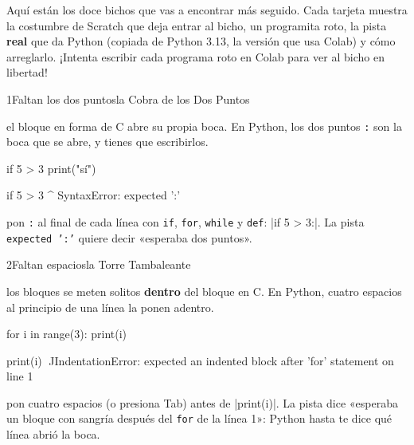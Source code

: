 Aquí están los doce bichos que vas a encontrar más seguido. Cada tarjeta muestra la costumbre de Scratch que deja entrar al bicho, un programita roto, la pista \textbf{real} que da Python (copiada de Python 3.13, la versión que usa Colab) y cómo arreglarlo. ¡Intenta escribir cada programa roto en Colab para ver al bicho en libertad!

\begin{bzcard}{1}{Faltan los dos puntos}{la Cobra de los Dos Puntos}
\noindent\begin{minipage}[c]{0.43\linewidth}
 el bloque en forma de C  abre su propia boca. En Python, los dos puntos \texttt{:} son la boca que se abre, y tienes que escribirlos.
\end{minipage}\hfill
\begin{minipage}[c]{0.54\linewidth}
\begin{bzsnip}
if 5 > 3
    print("sí")
\end{bzsnip}
\end{minipage}\par
\begin{bzerror}
    if 5 > 3
            ^
SyntaxError: expected ':'
\end{bzerror}
 pon \texttt{:} al final de cada línea con \texttt{if}, \texttt{for}, \texttt{while} y \texttt{def}: \py|if 5 > 3:|. La pista \texttt{expected ':'} quiere decir «esperaba dos puntos».
\end{bzcard}

\begin{bzcard}{2}{Faltan espacios}{la Torre Tambaleante}
\noindent\begin{minipage}[c]{0.43\linewidth}
 los bloques se meten solitos \textbf{dentro} del bloque en C. En Python, cuatro espacios al principio de una línea la ponen adentro.
\end{minipage}\hfill
\begin{minipage}[c]{0.54\linewidth}
\begin{bzsnip}
for i in range(3):
print(i)
\end{bzsnip}
\end{minipage}\par
\begin{bzerrorsmall}
    print(i)
    ^^^^^
IndentationError: expected an indented block after 'for' statement on line 1
\end{bzerrorsmall}
 pon cuatro espacios (o presiona Tab) antes de \py|print(i)|. La pista dice «esperaba un bloque con sangría después del \texttt{for} de la línea 1»: Python hasta te dice qué línea abrió la boca.
\end{bzcard}

